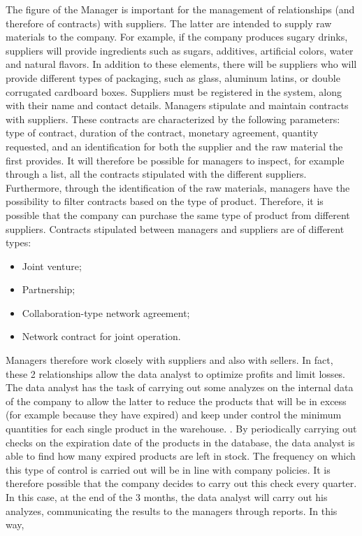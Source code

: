 The figure of the Manager is important for the management of relationships (and therefore of contracts) with suppliers.
The latter are intended to supply raw materials to the company. For example, if the company produces sugary drinks, suppliers
will provide ingredients such as sugars, additives, artificial colors, water and natural flavors. In addition to these elements, there
will be suppliers who will provide different types of packaging, such as glass, aluminum latins, or double corrugated cardboard boxes.
Suppliers must be registered in the system, along with their name and contact details. Managers stipulate and maintain contracts with suppliers.
These contracts are characterized by the following parameters: type of contract, duration of the contract, monetary agreement, quantity requested,
and an identification for both the supplier and the raw material the first provides. It will therefore be possible for managers to inspect, for example
through a list, all the contracts stipulated with the different suppliers. Furthermore, through the identification of the raw materials, managers have
 the possibility to filter contracts based on the type of product. Therefore, it is possible that the company can purchase the same type of product
 from different suppliers. Contracts stipulated between managers and suppliers are of different types:
\begin{itemize}
    \item Joint venture;
    \item Partnership;
    \item Collaboration-type network agreement;
    \item Network contract for joint operation.
\end{itemize}
Managers therefore work closely with suppliers and also with sellers. In fact, these 2 relationships allow the data analyst to optimize profits and limit losses.
The data analyst has the task of carrying out some analyzes on the internal data of the company to allow the latter to reduce the products that will be in excess
(for example because they have expired) and keep under control the minimum quantities for each single product in the warehouse. . By periodically carrying out checks
on the expiration date of the products in the database, the data analyst is able to find how many expired products are left in stock. The frequency on which this
type of control is carried out will be in line with company policies. It is therefore possible that the company decides to carry out this check every quarter.
In this case, at the end of the 3 months, the data analyst will carry out his analyzes, communicating the results to the managers through reports. In this way,
